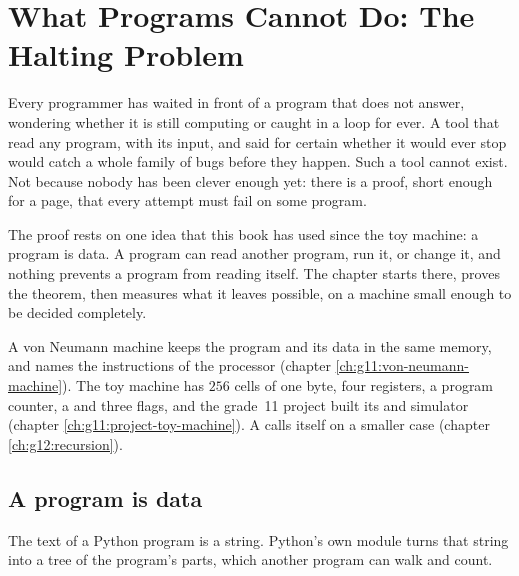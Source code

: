 \chapter{What Programs Cannot Do: The Halting Problem}\label{ch:g12:halting-problem}

Every programmer has waited in front of a program that does not answer, wondering whether it is still computing or
caught in a loop for ever. A tool that read any program, with its input, and said for certain whether it would ever
stop would catch a whole family of bugs before they happen. Such a tool cannot exist. Not because nobody has been
clever enough yet: there is a proof, short enough for a page, that every attempt must fail on some program.

The proof rests on one idea that this book has used since the toy machine: a program is data. A program can read
another program, run it, or change it, and nothing prevents a program from reading itself. The chapter starts there,
proves the theorem, then measures what it leaves possible, on a machine small enough to be decided completely.

\begin{recall}
A von Neumann machine keeps the program and its data in the same memory, and  names the
instructions of the processor (chapter \ref{ch:g11:von-neumann-machine}). The toy machine has $256$ cells of one byte,
four registers, a program counter, a  and three flags, and the grade~11 project built its  and
simulator (chapter \ref{ch:g11:project-toy-machine}). A  calls itself on a smaller case (chapter
\ref{ch:g12:recursion}).
\end{recall}

\section{A program is data}\label{sec:g12:halting-problem:data}

The text of a Python program is a string. Python's own module  turns that string into a tree of the
program's parts, which another program can walk and count.

